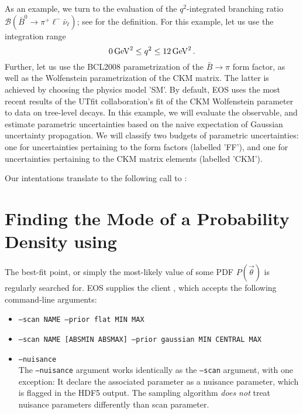 As an example, we turn to the evaluation of the $q^2$-integrated branching ratio
$\mathcal{B}(\bar{B}^0\to \pi^+\ell^-\bar\nu_\ell)$; see 
for the definition.
For this example, let us use the integration range
\begin{equation*}
    0\,\mathrm{GeV}^2 \leq q^2 \leq 12\,\mathrm{GeV}^2\,.
\end{equation*}
Further, let us use the BCL2008 \cite{Bourrely:2008za} parametrization of the $\bar{B}\to \pi$ form factor,
as well as the Wolfenstein parametrization of the CKM matrix. The latter is achieved
by choosing the physics model 'SM'. By default, EOS uses the most recent results of
the UTfit collaboration's fit of the CKM Wolfenstein parameter to data on tree-level decays.
In this example, we will evaluate the observable, and estimate parametric uncertainties
based on the naive expectation of Gaussian uncertainty propagation. We will classify two
budgets of parametric uncertainties: one for uncertainties pertaining to the form factors
(labelled 'FF'), and one for uncertainties pertaining to the CKM matrix elements (labelled 'CKM').

Our intentations translate to the following call to :

\section{Finding the Mode of a Probability Density using \textbf{}}
\label{sec:usage:eos-find-mode}

The best-fit point, or simply the most-likely value of some \gls{PDF} $P(\vec\theta)$ is
regularly searched for. EOS supplies the client , which accepts the
following command-line arguments:
\begin{itemize}
    \item[] \texttt{--scan NAME --prior flat MIN MAX}\\[\medskipamount]

    \item[] \texttt{--scan NAME [ABSMIN ABSMAX] --prior gaussian MIN CENTRAL MAX}\\[\medskipamount]

    \item[] \texttt{--nuisance}\\[\medskipamount]
        The \texttt{--nuisance} argument works identically as the \texttt{--scan} argument,
        with one exception: It declare the associated parameter as a nuisance parameter, which
        is flagged in the HDF5 output. The sampling algorithm \emph{does not} treat nuisance
        parameters differently than scan parameter.
\end{itemize}

